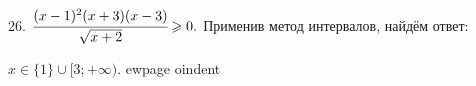 26. $\cfrac{(x-1)^2(x+3)(x-3)}{\sqrt{x+2}}\geqslant0.$ Применив метод интервалов, найдём ответ:
\begin{figure}[ht!]
\end{figure}
$x\in\{1\}\cup[3;+\infty).$
ewpage
oindent
